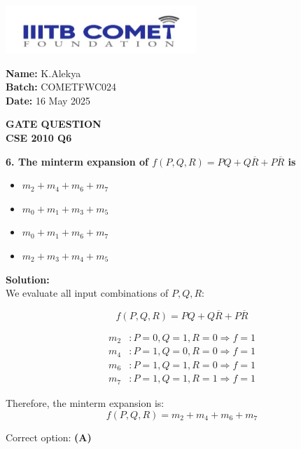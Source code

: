 \documentclass[12pt]{article}
\begin{document}
\begin{minipage}{0.6\textwidth}
    \includegraphics[height=1.8cm]{iiitbcomet.jpg} %
\end{minipage}
\hfill
\begin{minipage}{0.35\textwidth}
\raggedleft
\textbf{Name:} K.Alekya \\
\textbf{Batch:} COMETFWC024 \\
\textbf{Date:} 16 May 2025
\end{minipage}

\begin{center}
    {\color{cyan} \LARGE \textbf{GATE QUESTION}}\\
    {\color{cyan} \Large \textbf{CSE 2010 Q6}}
\end{center}

\vspace{1em}

\textbf{6. \quad The minterm expansion of $f(P, Q, R) = PQ + Q\overline{R} + P\overline{R}$ is}

\begin{multicols}{2}
\begin{itemize}[label=(A)]
  \item $m_2 + m_4 + m_6 + m_7$
\end{itemize}

\begin{itemize}[label=(B)]
  \item $m_0 + m_1 + m_3 + m_5$
\end{itemize}

\columnbreak

\begin{itemize}[label=(C)]
  \item $m_0 + m_1 + m_6 + m_7$
\end{itemize}

\begin{itemize}[label=(D)]
  \item $m_2 + m_3 + m_4 + m_5$
\end{itemize}
\end{multicols}

\textbf{Solution:} \\
We evaluate all input combinations of $P, Q, R$:

\[
f(P, Q, R) = PQ + Q\overline{R} + P\overline{R}
\]

\begin{align*}
m_2 &: P=0, Q=1, R=0 \Rightarrow f=1 \\
m_4 &: P=1, Q=0, R=0 \Rightarrow f=1 \\
m_6 &: P=1, Q=1, R=0 \Rightarrow f=1 \\
m_7 &: P=1, Q=1, R=1 \Rightarrow f=1
\end{align*}

Therefore, the minterm expansion is: \\
\[
\boxed{f(P, Q, R) = m_2 + m_4 + m_6 + m_7}
\]

Correct option: \textbf{(A)}
\end{document}
